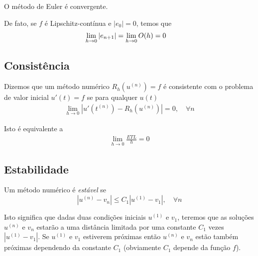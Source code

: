 \begin{teo}
O método de Euler é convergente.
\end{teo}

De fato, se $f$ é Lipschitz-contínua e $|e_0|=0$, temos que
\begin{eqnarray}
 \lim_{h\rightarrow 0} |e_{n+1}|  &= \lim_{h\rightarrow 0} \mathcal \mathcal{O}(h) = 0
\end{eqnarray}


\subsection{Consistência}
\begin{defn}
Dizemos que um método numérico $R_h(u^{(n)})=f$ é consistente com o problema de valor inicial $u'(t)=f$ se para qualquer $u(t)$
\begin{eqnarray}
  \lim_{h \rightarrow 0} |u'(t^{(n)})-R_h(u^{(n)})| = 0, \quad  \forall n
\end{eqnarray}
\end{defn}

Isto é equivalente a
\begin{eqnarray}
  \lim_{h \rightarrow 0} \frac{ETL}{h} = 0
\end{eqnarray}



%
%

\subsection{Estabilidade}
\begin{defn}
Um método numérico é \emph{estável} se
$$ |u^{(n)}-v_n| \leq  C_1|u^{(1)}-v_1|, \quad  \forall n$$
\end{defn}
Isto significa que dadas duas condições iniciais $u^{(1)}$ e $v_1$, teremos que as soluções $u^{(n)}$ e $v_n$ estarão a uma distância limitada  por uma constante $C_1$ vezes $|u^{(1)}-v_1|$. Se $u^{(1)}$ e $v_1$ estiverem próximas então $u^{(n)}$ e $v_n$ estão também próximas dependendo da constante $C_1$ (obviamente $C_1$ depende da função $f$).


